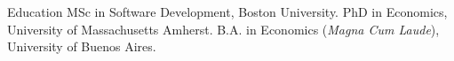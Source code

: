 
\def\arraystretch{1.3}
\begin{rubric}{Education}
\entry*[2019] MSc in Software Development, Boston University.
\entry*[2009] PhD in Economics, University of Massachusetts Amherst.
\entry*[2000] B.A. in Economics (\emph{Magna Cum Laude}), University of Buenos Aires.
\end{rubric}



